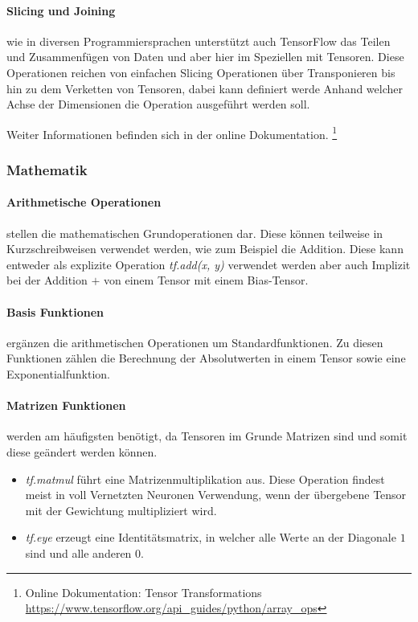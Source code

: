 \paragraph{Slicing und Joining} wie in diversen Programmiersprachen unterstützt auch TensorFlow das Teilen und Zusammenfügen von Daten und aber hier im Speziellen mit Tensoren. 
Diese Operationen reichen von einfachen Slicing Operationen über Transponieren bis hin zu dem Verketten von Tensoren, dabei kann definiert werde Anhand welcher Achse der Dimensionen die Operation ausgeführt werden soll.

\phantom \newline

\noindent
Weiter Informationen befinden sich in der online Dokumentation. \footnote{Online Dokumentation: Tensor Transformations \url{https://www.tensorflow.org/api_guides/python/array_ops}}

\subsubsection{Mathematik} 

\paragraph{Arithmetische Operationen} stellen die mathematischen Grundoperationen dar. 
Diese können teilweise in Kurzschreibweisen verwendet werden, wie zum Beispiel die Addition. 
Diese kann entweder als explizite Operation \textit{tf.add(x, y)} verwendet werden aber auch Implizit bei der Addition $+$ von einem Tensor mit einem Bias-Tensor.

\paragraph{Basis Funktionen} ergänzen die arithmetischen Operationen um Standardfunktionen. 
Zu diesen Funktionen zählen die Berechnung der Absolutwerten in einem Tensor sowie eine Exponentialfunktion. 

\paragraph{Matrizen Funktionen} werden am häufigsten benötigt, da Tensoren im Grunde Matrizen sind und somit diese geändert werden können. 
\begin{itemize}
	\item \textit{tf.matmul} führt eine Matrizenmultiplikation aus. 
	Diese Operation findest meist in voll Vernetzten Neuronen Verwendung, wenn der übergebene Tensor mit der Gewichtung multipliziert wird. 
	\item \textit{tf.eye} erzeugt eine Identitätsmatrix, in welcher alle Werte an der Diagonale $1$ sind und alle anderen $0$. 
\end{itemize}

